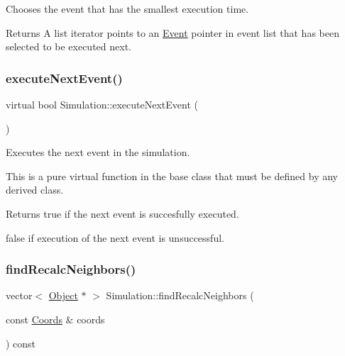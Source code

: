 Chooses the event that has the smallest execution time. \begin{DoxyReturn}{Returns}
A list iterator points to an \hyperlink{class_event}{Event} pointer in event list that has been selected to be executed next. 
\end{DoxyReturn}
\mbox{\label{class_simulation_a48e9e82f9dac1acec5d063a9f6f6115e}} 
\subsubsection{\texorpdfstring{execute\+Next\+Event()}{executeNextEvent()}}
{\footnotesize\ttfamily virtual bool Simulation\+::execute\+Next\+Event (\begin{DoxyParamCaption}{ }\end{DoxyParamCaption})\hspace{0.3cm}{\ttfamily [pure virtual]}}

Executes the next event in the simulation.

This is a pure virtual function in the base class that must be defined by any derived class. \begin{DoxyReturn}{Returns}
true if the next event is succesfully executed. 

false if execution of the next event is unsuccessful. 
\end{DoxyReturn}
\mbox{\label{class_simulation_aa6501dc60b4a3981f6ca44cec861364a}} 
\subsubsection{\texorpdfstring{find\+Recalc\+Neighbors()}{findRecalcNeighbors()}}
{\footnotesize\ttfamily vector$<$ \hyperlink{class_object}{Object} $\ast$ $>$ Simulation\+::find\+Recalc\+Neighbors (\begin{DoxyParamCaption}\item[{const \hyperlink{struct_coords}{Coords} \&}]{coords }\end{DoxyParamCaption}) const\hspace{0.3cm}{\ttfamily [protected]}}



